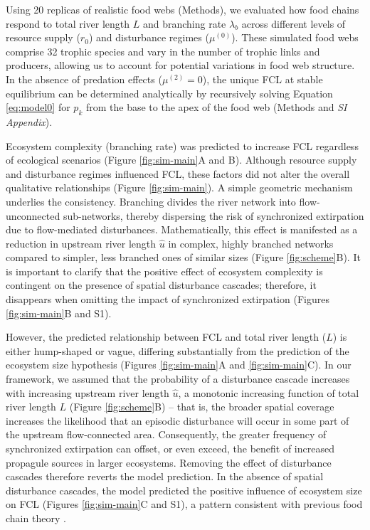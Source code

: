 \documentclass[11pt, class=article, crop=false]{standalone}
\begin{document}


Using 20 replicas of realistic food webs (Methods), we evaluated how food chains respond to total river length $L$ and branching rate $\lambda_b$ across different levels of resource supply ($r_0$) and disturbance regimes ($\mu^{(0)}$).
These simulated food webs comprise 32 trophic species and vary in the number of trophic links and producers, allowing us to account for potential variations in food web structure.
In the absence of predation effects ($\mu^{(2)} = 0$), the unique FCL at stable equilibrium can be determined analytically by recursively solving Equation \ref{eq:model0} for $p_k$ from the base to the apex of the food web (Methods and \textit{SI Appendix}).

Ecosystem complexity (branching rate) was predicted to increase FCL regardless of ecological scenarios (Figure \ref{fig:sim-main}A and B).
Although resource supply and disturbance regimes influenced FCL, these factors did not alter the overall qualitative relationships (Figure \ref{fig:sim-main}).
A simple geometric mechanism underlies the consistency.
Branching divides the river network into flow-unconnected sub-networks, thereby dispersing the risk of synchronized extirpation due to flow-mediated disturbances.
Mathematically, this effect is manifested as a reduction in upstream river length $\hat{u}$ in complex, highly branched networks compared to simpler, less branched ones of similar sizes (Figure \ref{fig:scheme}B).
It is important to clarify that the positive effect of ecosystem complexity is contingent on the presence of spatial disturbance cascades; therefore, it disappears when omitting the impact of synchronized extirpation (Figures \ref{fig:sim-main}B and S1).

However, the predicted relationship between FCL and total river length ($L$) is either hump-shaped or vague, differing substantially from the prediction of the ecosystem size hypothesis (Figures \ref{fig:sim-main}A and \ref{fig:sim-main}C).
In our framework, we assumed that the probability of a disturbance cascade increases with increasing upstream river length $\hat{u}$, a monotonic increasing function of total river length $L$ (Figure \ref{fig:scheme}B) -- that is, the broader spatial coverage increases the likelihood that an episodic disturbance will occur in some part of the upstream flow-connected area.
Consequently, the greater frequency of synchronized extirpation can offset, or even exceed, the benefit of increased propagule sources in larger ecosystems.
Removing the effect of disturbance cascades therefore reverts the model prediction. 
In the absence of spatial disturbance cascades, the model predicted the positive influence of ecosystem size on FCL (Figures \ref{fig:sim-main}C and S1), a pattern consistent with previous food chain theory \citep{holt_food_2002, takimoto_effects_2012, terui_spatial_2019, guo_towards_2023}.
\end{document}
